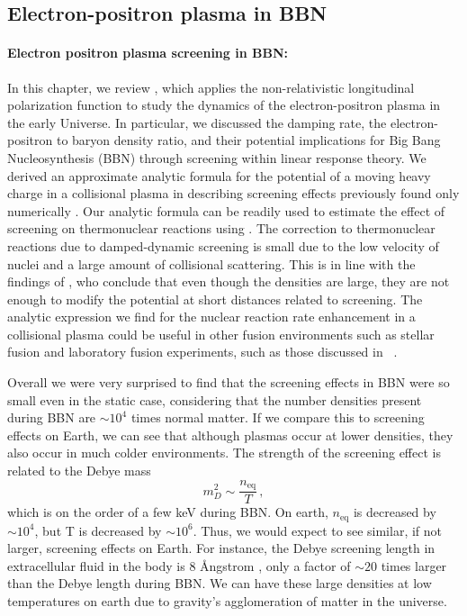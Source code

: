 \subsection{Electron-positron plasma in BBN}\label{chap:bbn}


\paragraph{Electron positron plasma screening in BBN:}\label{sec:Discussion}

In this chapter, we review \cite{Grayson:2023flr}, which applies the non-relativistic longitudinal polarization function to study the dynamics of the electron-positron plasma in the early Universe. In particular, we discussed the damping rate, the electron-positron to baryon density ratio, and their potential implications for Big Bang Nucleosynthesis (BBN) through screening within linear response theory. We derived an approximate analytic formula for the potential of a moving heavy charge in a collisional plasma in  describing screening effects previously found only numerically \cite{Hwang:2021kno}. Our analytic formula can be readily used to estimate the effect of screening on thermonuclear reactions using . The correction to thermonuclear reactions due to damped-dynamic screening is small due to the low velocity of nuclei and a large amount of collisional scattering. This is in line with the findings of \cite{Hwang:2021kno}, who conclude that even though the densities are large, they are not enough to modify the potential at short distances related to screening. The analytic expression we find for the nuclear reaction rate enhancement  in a collisional plasma could be useful in other fusion environments such as stellar fusion and laboratory fusion experiments, such as those discussed in ~\cite{Labaune:2013dla,Margarone:2022mdpi}.

Overall we were very surprised to find that the screening effects in BBN were so small even in the static case, considering that the number densities present during BBN are $\sim 10^4$ times normal matter. If we compare this to screening effects on Earth, we can see that although plasmas occur at lower densities, they also occur in much colder environments. The strength of the screening effect is related to the Debye mass
\begin{equation}
m_D^2 \sim \frac{n_\text{eq} }{T}\,,
\end{equation}
which is on the order of a few keV during BBN. On earth, $n_\text{eq}$ is decreased by $\sim 10^4$, but T is decreased by $\sim 10^6$. Thus, we would expect to see similar, if not larger, screening effects on Earth. For instance, the Debye screening length in extracellular fluid in the body is 8 \AA ngstrom \cite{Wennerstrom:2020}, only a factor of $\sim 20$ times larger than the Debye length during BBN. We can have these large densities at low temperatures on earth due to gravity's agglomeration of matter in the universe.

